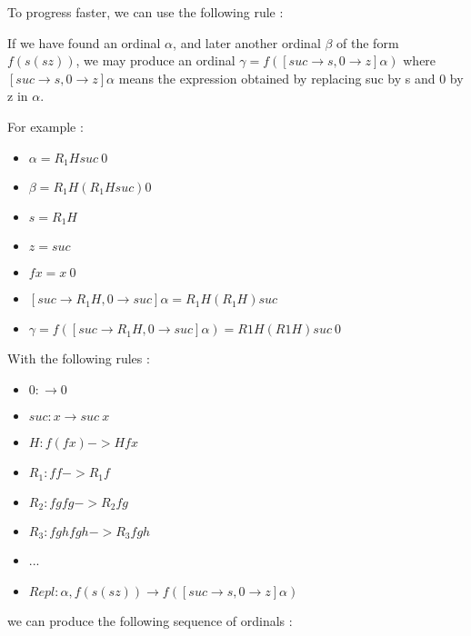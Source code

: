 \documentclass[10pt]{article}
\begin{document}
To progress faster, we can use the following rule :

If we have found an ordinal \( \alpha \), and later another ordinal \( \beta \) of the form \( f (s (s z)) \), we may produce an ordinal \( \gamma = f ([suc \rightarrow s,0 \rightarrow z] \alpha) \) where \( [suc \rightarrow s, 0 \rightarrow z] \alpha \) means the expression obtained by replacing suc by s and 0 by z in \( \alpha \).

For example :

\begin{itemize}
     \setlength{\itemsep}{1pt}
     \setlength{\parskip}{0pt}
     \setlength{\parsep}{0pt}

\item \( \alpha = R_1 H suc\ 0 \)
\item \( \beta = R_1 H (R_1 H suc) 0 \)
\item \( s = R_1 H \)
\item \( z = suc \)
\item \( f x = x\ 0 \)
\item \( [suc \rightarrow R_1 H,0 \rightarrow suc] \alpha = R_1 H (R_1 H) suc \)
\item \( \gamma = f ([suc \rightarrow R_1 H,0 \rightarrow suc] \alpha) = R1 H (R1 H) suc\ 0 \)

\end{itemize}


With the following rules :

\begin{itemize}
     \setlength{\itemsep}{1pt}
     \setlength{\parskip}{0pt}
     \setlength{\parsep}{0pt}

\item \( 0 : \rightarrow 0 \)
\item \( suc : x \rightarrow suc\ x \)
\item \( H : f (f x) -> H f x \)
\item \( R_1 : f f -> R_1 f \)
\item \( R_2 : f g f g -> R_2 f g \)
\item \( R_3 : f g h f g h -> R_3 f g h \)
\item ...
\item \( Repl : \alpha, f (s (s z)) \rightarrow f([suc \rightarrow s,0 \rightarrow z] \alpha) \)

\end{itemize} 

we can produce the following sequence of ordinals :
\end{document}
